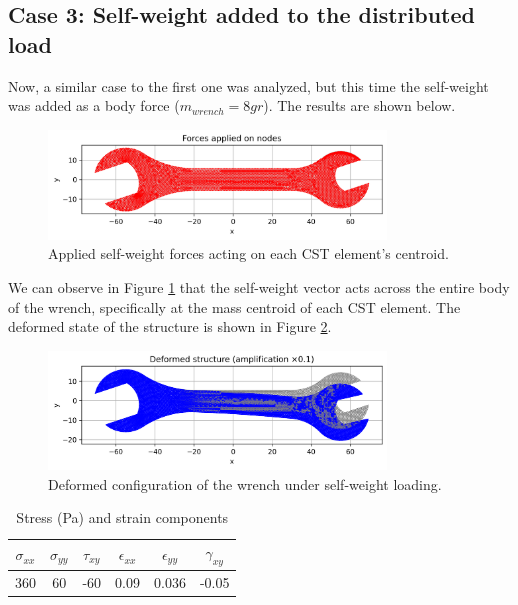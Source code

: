 \subsection{Case 3: Self-weight added to the distributed load}

Now, a similar case to the first one was analyzed, but this time the self-weight was added as a body force ($m_{wrench} = 8 gr$). The results are shown below.

\begin{figure}[H]
    \centering
    \includegraphics[width=0.8\textwidth]{GRAFICOS/Case c_fuerzas.png}
    \caption{Applied self-weight forces acting on each CST element's centroid.}
    \label{fig:xdiwi}
\end{figure}

We can observe in Figure \ref{fig:xdiwi} that the self-weight vector acts across the entire body of the wrench, specifically at the mass centroid of each CST element.  
The deformed state of the structure is shown in Figure \ref{fig:xdiwi2}.

\begin{figure}[H]
    \centering
    \includegraphics[width=0.8\textwidth]{GRAFICOS/Case c_deformada.png}
    \caption{Deformed configuration of the wrench under self-weight loading.}
    \label{fig:xdiwi2}
\end{figure}


\begin{table}[H]
    \centering
    \caption{Stress (Pa) and strain components}
    \begin{tabular}{|c|c|c|c|c|c|}
    \hline
    $\sigma_{xx}$ & $\sigma_{yy}$ & $\tau_{xy}$ & $\epsilon_{xx}$ & $\epsilon_{yy}$ & $\gamma_{xy}$ \\
    \hline
    360 & 60 & -60 & 0.09 & 0.036 & -0.05 \\
    \hline
    \end{tabular}
    \label{tab:tabla1}
\end{table}
    
